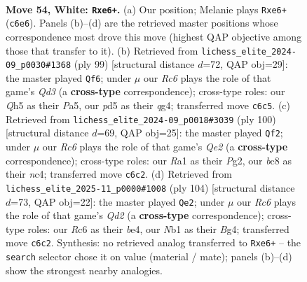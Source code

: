 \documentclass[11pt]{article}
\begin{document}
\clearpage

\begin{figure}[p]\centering
\begin{subfigure}{0.46\textwidth}\centering
\resizebox{\linewidth}{!}{%
\newchessgame
\chessboard[
  setfen={1qb5/r7/2R1p3/p2pkpBQ/P6P/8/8/RN4K1 w - - 0 54},
  showmover=false,
  pgfstyle=straightmove, color=movearrow, markmove={c6-e6}
]}
\caption{}
\end{subfigure}\hfill
\begin{subfigure}{0.46\textwidth}\centering
\resizebox{\linewidth}{!}{%
\newchessgame
\chessboard[
  setfen={3b4/kp6/2pq2B1/p6K/P2P2Q1/2P1r3/1P4R1/8 b - - 2 50},
  showmover=false,
  pgfstyle=straightmove, color=movearrow, markmove={d6-f6}
]}
\caption{}
\end{subfigure}
\\[4pt]
\begin{subfigure}{0.46\textwidth}\centering
\resizebox{\linewidth}{!}{%
\newchessgame
\chessboard[
  setfen={8/5pk1/5bp1/8/2nq3p/2p4P/2B1Q1P1/5R1K w - - 2 51},
  showmover=false,
  pgfstyle=straightmove, color=movearrow, markmove={e2-f2}
]}
\caption{}
\end{subfigure}\hfill
\begin{subfigure}{0.46\textwidth}\centering
\resizebox{\linewidth}{!}{%
\newchessgame
\chessboard[
  setfen={6rk/4b2p/p4p2/2q1pP2/4bpB1/7P/3Q3K/8 w - - 4 53},
  showmover=false,
  pgfstyle=straightmove, color=movearrow, markmove={d2-e2}
]}
\caption{}
\end{subfigure}
\caption{\textbf{Move 54, White: \texttt{Rxe6+}.} (a) Our position; Melanie plays \texttt{Rxe6+} (\texttt{c6e6}). Panels (b)--(d) are the retrieved master positions whose correspondence most drove this move (highest QAP objective among those that transfer to it). (b) Retrieved from \texttt{lichess\_elite\_2024-09\_p0030\#1368} (ply 99) [structural distance $d$=72, QAP obj=29]: the master played \texttt{Qf6}; under $\mu$ our \emph{Rc6} plays the role of that game's \emph{Qd3} (a \textbf{cross-type} correspondence); cross-type roles: our \emph{Q}h5 as their \emph{P}a5, our \emph{p}d5 as their \emph{q}g4; transferred move \texttt{c6c5}. (c) Retrieved from \texttt{lichess\_elite\_2024-09\_p0018\#3039} (ply 100) [structural distance $d$=69, QAP obj=25]: the master played \texttt{Qf2}; under $\mu$ our \emph{Rc6} plays the role of that game's \emph{Qe2} (a \textbf{cross-type} correspondence); cross-type roles: our \emph{R}a1 as their \emph{P}g2, our \emph{b}c8 as their \emph{n}c4; transferred move \texttt{c6c2}. (d) Retrieved from \texttt{lichess\_elite\_2025-11\_p0000\#1008} (ply 104) [structural distance $d$=73, QAP obj=22]: the master played \texttt{Qe2}; under $\mu$ our \emph{Rc6} plays the role of that game's \emph{Qd2} (a \textbf{cross-type} correspondence); cross-type roles: our \emph{R}c6 as their \emph{b}e4, our \emph{N}b1 as their \emph{B}g4; transferred move \texttt{c6c2}. Synthesis: no retrieved analog transferred to \texttt{Rxe6+} -- the \texttt{search} selector chose it on value (material / mate); panels (b)--(d) show the strongest nearby analogies.}
\label{fig:thought-m106}
\end{figure}
\end{document}
